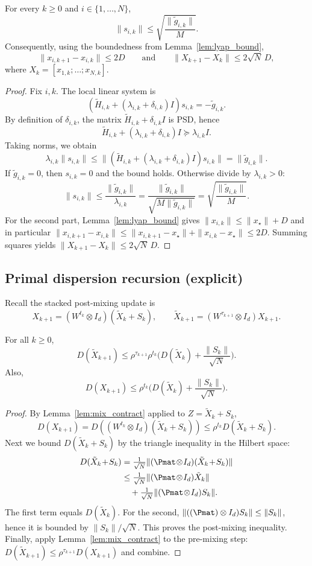 \documentclass[review,onefignum,onetabnum]{siamart171218}
\begin{document}
\begin{lemma}\label{lem:step_bound_app}
For every $k\ge0$ and $i\in\{1,\dots,N\}$,
\[
\|s_{i,k}\|\le \sqrt{\frac{\|\tilde g_{i,k}\|}{M}}.
\]
Consequently, using the boundedness from Lemma~\ref{lem:lyap_bound},
\[
\|x_{i,k+1}-x_{i,k}\|\le 2D
\qquad\text{and}\qquad
\|X_{k+1}-X_k\|\le 2\sqrt N\,D,
\]
where $X_k=[x_{1,k};\dots;x_{N,k}]$.
\end{lemma}
\begin{proof}
Fix $i,k$. The local linear system is
\[
(\tilde H_{i,k}+(\lambda_{i,k}+\delta_{i,k})I)s_{i,k}=-\tilde g_{i,k}.
\]
By definition of $\delta_{i,k}$, the matrix $\tilde H_{i,k}+\delta_{i,k}I$ is PSD, hence
\[
\tilde H_{i,k}+(\lambda_{i,k}+\delta_{i,k})I \succeq \lambda_{i,k}I.
\]
Taking norms, we obtain
\[
\lambda_{i,k}\|s_{i,k}\|\le \|(\tilde H_{i,k}+(\lambda_{i,k}+\delta_{i,k})I)s_{i,k}\|=\|\tilde g_{i,k}\|.
\]
If $\tilde g_{i,k}=0$, then $s_{i,k}=0$ and the bound holds. Otherwise divide by $\lambda_{i,k}>0$:
\[
\|s_{i,k}\|\le \frac{\|\tilde g_{i,k}\|}{\lambda_{i,k}}
=\frac{\|\tilde g_{i,k}\|}{\sqrt{M\|\tilde g_{i,k}\|}}
=\sqrt{\frac{\|\tilde g_{i,k}\|}{M}}.
\]
For the second part, Lemma~\ref{lem:lyap_bound} gives $\|x_{i,k}\|\le \|x_\star\|+D$ and in particular
$\|x_{i,k+1}-x_{i,k}\|\le \|x_{i,k+1}-x_\star\|+\|x_{i,k}-x_\star\|\le 2D$.
Summing squares yields $\|X_{k+1}-X_k\|\le 2\sqrt N\,D$.
\end{proof}

\subsection{Primal dispersion recursion (explicit)}

Recall the stacked post-mixing update is
\[
X_{k+1}=(W^{t_k}\otimes I_d)(\tilde X_k+S_k),
\qquad
\tilde X_{k+1}=(W^{\tau_{k+1}}\otimes I_d)X_{k+1}.
\]
\begin{lemma}\label{lem:DX_rec}
For all $k\ge0$,
\[
D(\tilde X_{k+1})
\le \rho^{\tau_{k+1}}\rho^{t_k}\Big(D(\tilde X_k)+\frac{\|S_k\|}{\sqrt N}\Big).
\]
Also,
\[
D(X_{k+1})
\le \rho^{t_k}\Big(D(\tilde X_k)+\frac{\|S_k\|}{\sqrt N}\Big).
\]
\end{lemma}
\begin{proof}
By Lemma~\ref{lem:mix_contract} applied to $Z=\tilde X_k+S_k$,
\[
D(X_{k+1})=D((W^{t_k}\otimes I_d)(\tilde X_k+S_k))\le \rho^{t_k}D(\tilde X_k+S_k).
\]
Next we bound $D(\tilde X_k+S_k)$ by the triangle inequality in the Hilbert space:
\begin{align*}
D(\tilde X_k\!+\!S_k)
&=\tfrac1{\sqrt N}\|(\Pmat\!\otimes\! I_d)(\tilde X_k\!+\!S_k)\|\\
&\le \tfrac1{\sqrt N}\|(\Pmat\!\otimes\! I_d)\tilde X_k\|\\
&\quad+\tfrac1{\sqrt N}\|(\Pmat\!\otimes\! I_d)S_k\|.
\end{align*}
The first term equals $D(\tilde X_k)$.
For the second, $\|((\Pmat)\otimes I_d)S_k\|\le \|S_k\|$, hence it is bounded by $\|S_k\|/\sqrt N$.
This proves the post-mixing inequality.
Finally, apply Lemma~\ref{lem:mix_contract} to the pre-mixing step:
$D(\tilde X_{k+1})\le \rho^{\tau_{k+1}}D(X_{k+1})$ and combine.
\end{proof}
\end{document}
